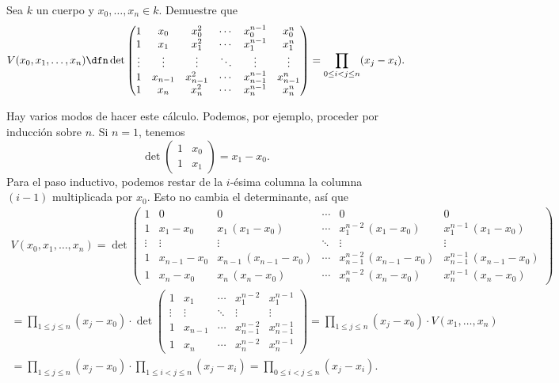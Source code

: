 \begin{ejercicio}
  Sea $k$ un cuerpo y $x_0, \ldots, x_n \in k$. Demuestre que
  \[ V (x_0,x_1,\ldots,x_n) \dfn \det \begin{pmatrix}
      1 & x_0 & x_0^2 & \cdots & x_0^{n-1} & x_0^n \\
      1 & x_1 & x_1^2 & \cdots & x_1^{n-1} & x_1^n \\
      \vdots & \vdots & \vdots & \ddots & \vdots & \vdots \\
      1 & x_{n-1} & x_{n-1}^2 & \cdots & x_{n-1}^{n-1} & x_{n-1}^n \\
      1 & x_n & x_n^2 & \cdots & x_n^{n-1} & x_n^n
    \end{pmatrix} = \prod_{0 \le i < j \le n} (x_j - x_i). \]

  \ifsolutions
  \begin{solucion}
    Hay varios modos de hacer este cálculo. Podemos, por ejemplo, proceder por
    inducción sobre $n$. Si $n = 1$, tenemos
    $$\det \begin{pmatrix}
      1 & x_0 \\
      1 & x_1
    \end{pmatrix} = x_1 - x_0.$$
    Para el paso inductivo, podemos restar de la $i$-ésima columna la columna
    $(i-1)$ multiplicada por $x_0$. Esto no cambia el determinante, así que
    \begin{multline*}
      V (x_0,x_1,\ldots,x_n) = \det \begin{pmatrix}
        1 & 0 & 0 & \cdots & 0 & 0 \\
        1 & x_1-x_0 & x_1\,(x_1-x_0) & \cdots & x_1^{n-2}\,(x_1-x_0) & x_1^{n-1}\,(x_1-x_0) \\
        \vdots & \vdots & \vdots & \ddots & \vdots & \vdots \\
        1 & x_{n-1}-x_0 & x_{n-1}\,(x_{n-1}-x_0) & \cdots & x_{n-1}^{n-2}\,(x_{n-1}-x_0) & x_{n-1}^{n-1}\,(x_{n-1}-x_0) \\
        1 & x_n-x_0 & x_n\,(x_n-x_0) & \cdots & x_n^{n-2}\,(x_n-x_0) & x_n^{n-1}\,(x_n-x_0)
      \end{pmatrix} \\
      = \prod_{1 \le j \le n} (x_j - x_0) \cdot \det \begin{pmatrix}
        1 & x_1 & \cdots & x_1^{n-2} & x_1^{n-1} \\
        \vdots & \vdots & \ddots & \vdots & \vdots \\
        1 & x_{n-1} & \cdots & x_{n-1}^{n-2} & x_{n-1}^{n-1} \\
        1 & x_n & \cdots & x_n^{n-2} & x_n^{n-1}
      \end{pmatrix} = \prod_{1 \le j \le n} (x_j - x_0) \cdot V (x_1,\ldots,x_n) \\
      = \prod_{1 \le j \le n} (x_j - x_0) \cdot \prod_{1 \le i < j \le n} (x_j - x_i) = \prod_{0 \le i < j \le n} (x_j - x_i).
    \end{multline*}
  \end{solucion}
  \fi
\end{ejercicio}

